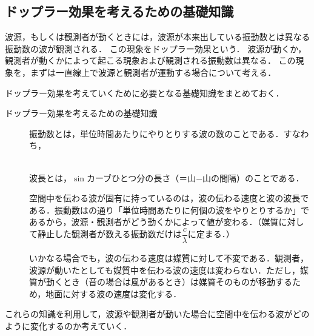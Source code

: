 \setcounter{nombre}{12}

\subsection{ドップラー効果を考えるための基礎知識}

波源，もしくは観測者が動くときには，波源が本来出している振動数とは異なる振動数の波が観測される．
この現象を{\gtfamily ドップラー効果}という．
波源が動くか，観測者が動くかによって起こる現象および観測される振動数は異なる．
この現象を，まずは一直線上で波源と観測者が運動する場合について考える．

ドップラー効果を考えていくために必要となる基礎知識をまとめておく．

\begin{matome}{ドップラー効果を考えるための基礎知識}
\begin{description}
\item[] 振動数とは，単位時間あたりにやりとりする波の数のことである．すなわち，\\
\\
\item[] 波長とは，$\sin$カーブひとつ分の長さ（＝山−山の間隔）のことである．
\item[] 空間中を伝わる波が固有に持っているのは，{\gtfamily 波の伝わる速度と波の波長である．}振動数はの通り「単位時間あたりに何個の波をやりとりするか」であるから，{\gtfamily 波源・観測者がどう動くかによって値が変わる．}（媒質に対して静止した観測者が数える振動数だけは$\dfrac{c}{\lambda}$に定まる．）
\item[] いかなる場合でも，{\gtfamily 波の伝わる速度は媒質に対して不変である．観測者，波源が動いたとしても媒質中を伝わる波の速度は変わらない．}ただし，媒質が動くとき（音の場合は風があるとき）は媒質そのものが移動するため，地面に対する波の速度は変化する．
\end{description}
\end{matome}

これらの知識を利用して，波源や観測者が動いた場合に空間中を伝わる波がどのように変化するのか考えていく．

